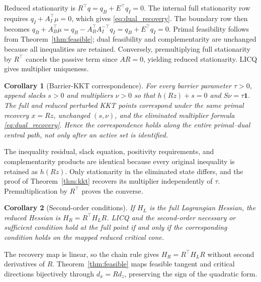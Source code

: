 \documentclass[journal,10pt]{IEEEtran}
\newtheorem{corollary}{Corollary}
\begin{document}
\begin{IEEEproof}
Reduced stationarity is $R^\top q=q_B+E^\top q_I=0$.  The internal full
stationarity row requires $q_I+A_I^\top\mu=0$, which gives
\eqref{eq:dual_recovery}.  The boundary row then becomes
$q_B+A_B^\top\mu=q_B-A_B^\top A_I^{-\top}q_I
=q_B+E^\top q_I=0$.  Primal feasibility follows from
Theorem~\ref{thm:feasible}; dual feasibility and complementarity are unchanged
because all inequalities are retained.  Conversely, premultiplying full
stationarity by $R^\top$ cancels the passive term since
$A R=0$, yielding reduced stationarity.  LICQ gives multiplier uniqueness.
\end{IEEEproof}

\begin{corollary}[Barrier-KKT correspondence]\label{cor:barrier}
For every barrier parameter $\tau>0$, append slacks $s>0$ and multipliers
$\nu>0$ so that $h(Rz)+s=0$ and $S\nu=\tau\mathbf{1}$.  The full and reduced
perturbed KKT points correspond under the same primal recovery $x=Rz$, unchanged
$(s,\nu)$, and the eliminated multiplier formula
\eqref{eq:dual_recovery}.  Hence the correspondence holds along the entire
primal--dual central path, not only after an active set is identified.
\end{corollary}

\begin{IEEEproof}
The inequality residual, slack equation, positivity requirements, and
complementarity products are identical because every original inequality is
retained as $h(Rz)$.  Only stationarity in the eliminated state differs, and
the proof of Theorem~\ref{thm:kkt} recovers its multiplier independently of
$\tau$.  Premultiplication by $R^\top$ proves the converse.
\end{IEEEproof}

\begin{corollary}[Second-order conditions]\label{cor:sosc}
If $H_L$ is the full Lagrangian Hessian, the reduced Hessian is
$H_R=R^\top H_LR$.  LICQ and the second-order necessary or sufficient condition
hold at the full point if and only if the corresponding condition holds on the
mapped reduced critical cone.
\end{corollary}

\begin{IEEEproof}
The recovery map is linear, so the chain rule gives $H_R=R^\top H_LR$ without
second derivatives of $R$.  Theorem~\ref{thm:feasible} maps feasible tangent and
critical directions bijectively through $d_x=Rd_z$, preserving the sign of the
quadratic form.
\end{IEEEproof}
\end{document}
